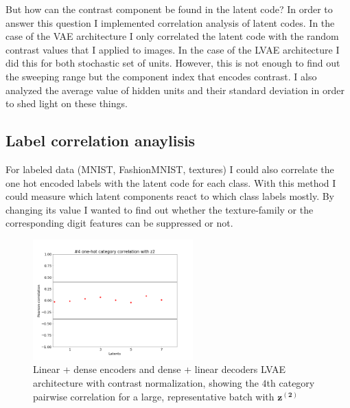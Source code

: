 \documentclass[12pt, english]{article}
\begin{document}
\vspace{4mm}

\par But how can the contrast component be found in the latent code? In order to answer this question I implemented correlation analysis of latent codes. In the case of the VAE architecture I only correlated the latent code with the random contrast values that I applied to images. In the case of the LVAE architecture I did this for both stochastic set of units. However, this is not enough to find out the sweeping range but the component index that encodes contrast. I also analyzed the average value of hidden units and their standard deviation in order to shed light on these things.

\vspace{4mm}

\subsection{Label correlation anaylisis}

\vspace{4mm}

\par For labeled data (MNIST, FashionMNIST, textures) I could also correlate the one hot encoded labels with the latent code for each class. With this method I could measure which latent components react to which class labels mostly. By changing its value I wanted to find out whether the texture-family or the corresponding digit features can be suppressed or not.

\vspace{4mm}

\begin{figure}[H]
    \centering
    \includegraphics[width=0.55\textwidth]{17_DenseLinLinLadderVAE_contrastNorm-cat-4-to-z2-corr.png}
    \caption{Linear + dense encoders and dense + linear decoders LVAE architecture with contrast normalization, showing the $4$th category pairwise correlation for a large, representative batch with $\bm{z^{(2)}}$}
\end{figure}
\end{document}
